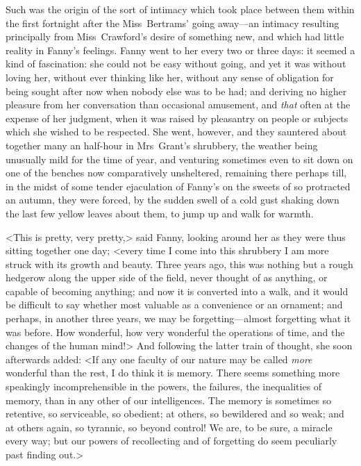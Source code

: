 Such was the origin of the sort of intimacy which took place between them within the first fortnight after the Miss~Bertrams' going away—an intimacy resulting principally from Miss~Crawford's desire of something new, and which had little reality in Fanny's feelings. Fanny went to her every two or three days: it seemed a kind of fascination: she could not be easy without going, and yet it was without loving her, without ever thinking like her, without any sense of obligation for being sought after now when nobody else was to be had; and deriving no higher pleasure from her conversation than occasional amusement, and \textit{that}  often at the expense of her judgment, when it was raised by pleasantry on people or subjects which she wished to be respected. She went, however, and they sauntered about together many an half-hour in Mrs~Grant's shrubbery, the weather being unusually mild for the time of year, and venturing sometimes even to sit down on one of the benches now comparatively unsheltered, remaining there perhaps till, in the midst of some tender ejaculation of Fanny's on the sweets of so protracted an autumn, they were forced, by the sudden swell of a cold gust shaking down the last few yellow leaves about them, to jump up and walk for warmth.

<This is pretty, very pretty,> said Fanny, looking around her as they were thus sitting together one day; <every time I come into this shrubbery I am more struck with its growth and beauty. Three years ago, this was nothing but a rough hedgerow along the upper side of the field, never thought of as anything, or capable of becoming anything; and now it is converted into a walk, and it would be difficult to say whether most valuable as a convenience or an ornament; and perhaps, in another three years, we may be forgetting—almost forgetting what it was before. How wonderful, how very wonderful the operations of time, and the changes of the human mind!> And following the latter train of thought, she soon afterwards added: <If any one faculty of our nature may be called \textit{more}  wonderful than the rest, I do think it is memory. There seems something more speakingly incomprehensible in the powers, the failures, the inequalities of memory, than in any other of our intelligences. The memory is sometimes so retentive, so serviceable, so obedient; at others, so bewildered and so weak; and at others again, so tyrannic, so beyond control! We are, to be sure, a miracle every way; but our powers of recollecting and of forgetting do seem peculiarly past finding out.>

